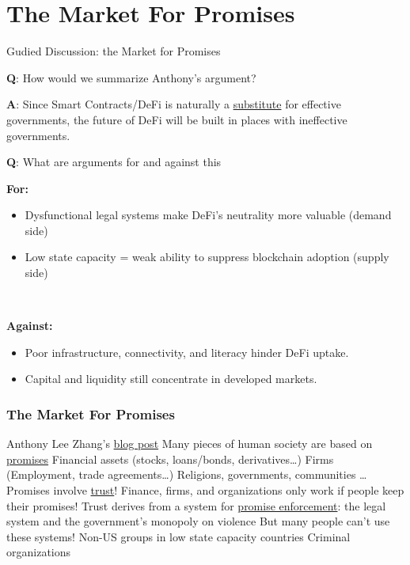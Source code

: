 \documentclass[]{beamer}
\begin{document}
\section[Market For Promises]{The Market For Promises}

\begin{frame}{Gudied Discussion: the Market for Promises}

\textbf{Q}: How would we summarize Anthony's argument? \\ \pause 

\textbf{A}: Since Smart Contracts/DeFi is naturally a \ul{substitute} for effective governments, the future of DeFi will be built in places with ineffective governments. \\ \pause 

\textbf{Q}: What are arguments for and against this  \\ \pause 

\textbf{For:} 
\begin{itemize}
    \item Dysfunctional legal systems make DeFi’s neutrality more valuable (demand side)
    \item Low state capacity = weak ability to suppress blockchain adoption (supply side) 
\end{itemize}

\\ \pause 

\textbf{Against:} 

\begin{itemize}
    \item Poor infrastructure, connectivity, and literacy hinder DeFi uptake. 
    \item Capital and liquidity still concentrate in developed markets.
\end{itemize}

\end{frame}


\begin{frame}
\frametitle{The Market For Promises}

Anthony Lee Zhang's \href{https://anthonyleezhang.substack.com/p/the-market-for-promises}{blog post}
\bi
\m Many pieces of human society are based on \ul{promises}
\bi
\m Financial assets (stocks, loans/bonds, derivatives\ldots) \pause
\m Firms (Employment, trade agreements\ldots) \pause
\m Religions, governments, communities \ldots \pause
\ei
\m Promises involve \ul{trust}! Finance, firms, and organizations only work if people keep their promises! \pause
\m Trust derives from a system for \ul{promise enforcement}: the legal system and the government's monopoly on violence \pause
\m But many people can't use these systems! \pause
\bi
\m Non-US groups in low state capacity countries \pause
\m Criminal organizations \pause
\ei
\ei

\end{frame}
\end{document}
